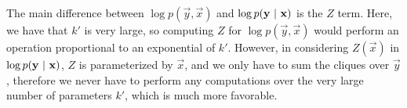 The main difference between $\log p(\vec{y}, \vec{x})$ and $\log p(\mathbf{y} ~\vert~ \mathbf{x})$ is the $Z$ term. Here, we have that $k'$ is very large, so computing $Z$ for $\log p(\vec{y},\vec{x})$ would perform an operation proportional to an exponential of $k'$.
However, in considering $Z(\vec{x})$ in $\log p(\mathbf{y} ~\vert~ \mathbf{x})$, $Z$ is parameterized by $\vec{x}$, and we only have to sum the cliques over $\vec{y}$, therefore we never have to perform any computations over the very large number of parameters $k'$, which is much more favorable.